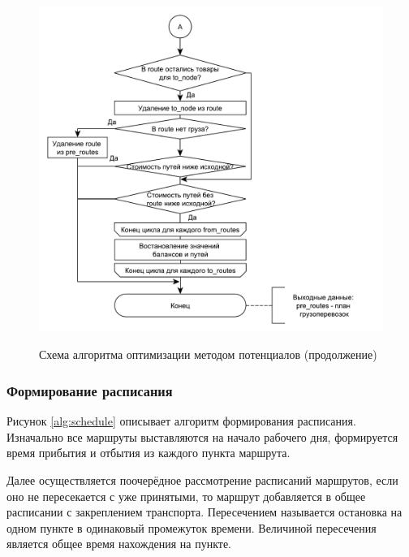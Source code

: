 \begin{figure}[h]
	\begin{center}
		{\includegraphics[scale=0.7, angle=0, page=1]{img/potential_optimize_2.pdf}}
		\caption{Схема алгоритма оптимизации методом потенциалов (продолжение)}
		\label{alg:potential_2}
	\end{center}
\end{figure}

\pagebreak
\subsubsection{Формирование расписания}
Рисунок \ref{alg:schedule} описывает алгоритм формирования расписания. Изначально все маршруты выставляются на начало рабочего дня, формируется время прибытия и отбытия из каждого пункта маршрута.

Далее осуществляется поочерёдное рассмотрение расписаний маршрутов, если оно не пересекается с уже принятыми, то маршрут добавляется в общее расписании с закреплением транспорта. Пересечением называется остановка на одном пункте в одинаковый промежуток времени. Величиной пересечения является общее время нахождения на пункте.

